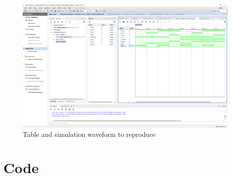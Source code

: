 \documentclass[11pt]{article}
\begin{document}
\begin{figure}[ht]\centering
	\includegraphics[width=1\textwidth,trim=18.3cm 15.8cm 0.2cm 4.3cm,clip]{lab1_example_screenshot}
	\caption{Table and simulation waveform to reproduce}
	\label{fig:another_image}		%
\end{figure}

\section*{Code}
\end{document}
